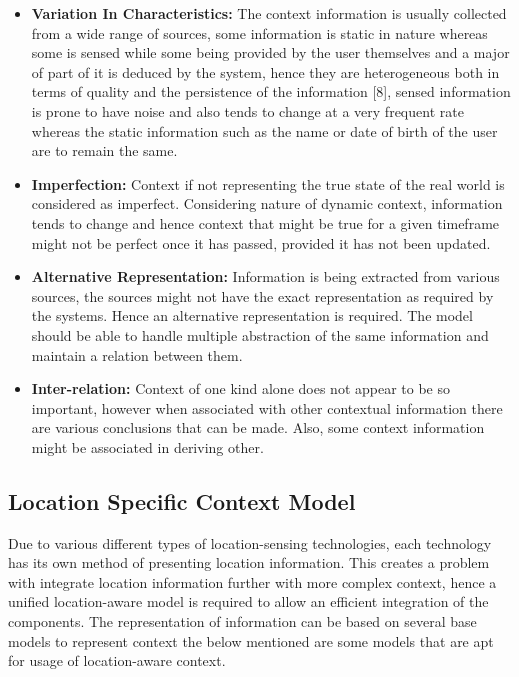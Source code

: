 \documentclass[12pt]{report}
\begin{document}
\begin{itemize}
\item \textbf{Variation In Characteristics:} The context information is usually collected from a wide range of sources, some information is static in nature whereas some is sensed while some being provided by the user themselves and a major of part of it is deduced by the system, hence they are heterogeneous both in terms of quality and the persistence of the information [8], sensed information is prone to have noise and also tends to change at a very frequent rate whereas the static information such as the name or date of birth of the user are to remain the same.
\item \textbf{Imperfection:} Context if not representing the true state of the real world is considered as imperfect. Considering nature of dynamic context, information tends to change and hence context that might be true for a given timeframe might not be perfect once it has passed, provided it has not been updated.
\item \textbf{Alternative Representation:} Information is being extracted from various sources, the sources might not have the exact representation as required by the systems. Hence an alternative representation is required. The model should be able to handle multiple abstraction of the same information and maintain a relation between them.
\item \textbf{Inter-relation:} Context of one kind alone does not appear to be so important, however when associated with other contextual information there are various conclusions that can be made. Also, some context information might be associated in deriving other.
\end{itemize}


\subsection{Location Specific Context Model}


Due to various different types of location-sensing technologies, each technology has its own method of presenting location information. This creates a problem with integrate location information further with more complex context, hence a unified location-aware model is required to allow an efficient integration of the components. The representation of information can be based on several base models to represent context the below mentioned are some models that are apt for usage of location-aware context.
\end{document}

